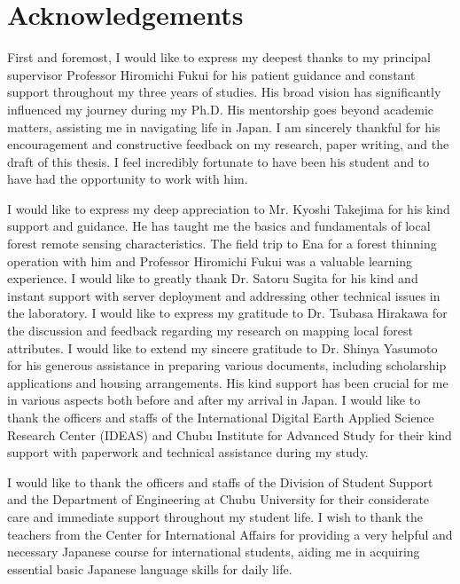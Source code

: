 \chapter*{Acknowledgements}
First and foremost, I would like to express my deepest thanks to my principal supervisor Professor Hiromichi Fukui for his patient guidance and constant support throughout my three years of studies. His broad vision has significantly influenced my journey during my Ph.D. His mentorship goes beyond academic matters, assisting me in navigating life in Japan. I am sincerely thankful for his encouragement and constructive feedback on my research, paper writing, and the draft of this thesis. I feel incredibly fortunate to have been his student and to have had the opportunity to work with him. \par

I would like to express my deep appreciation to Mr. Kyoshi Takejima for his kind support and guidance. He has taught me the basics and fundamentals of local forest remote sensing characteristics. The field trip to Ena for a forest thinning operation with him and Professor Hiromichi Fukui was a valuable learning experience. I would like to greatly thank Dr. Satoru Sugita for his kind and instant support with server deployment and addressing other technical issues in the laboratory. I would like to express my gratitude to Dr. Tsubasa Hirakawa for the discussion and feedback regarding my research on mapping local forest attributes. I would like to extend my sincere gratitude to Dr. Shinya Yasumoto for his generous assistance in preparing various documents, including scholarship applications and housing arrangements. His kind support has been crucial for me in various aspects both before and after my arrival in Japan. I would like to thank the officers and staffs of the International Digital Earth Applied Science Research Center (IDEAS) and Chubu Institute for Advanced Study for their kind support with paperwork and technical assistance during my study. \par

I would like to thank the officers and staffs of the Division of Student Support and the Department of Engineering at Chubu University for their considerate care and immediate support throughout my student life. I wish to thank the teachers from the Center for International Affairs for providing a very helpful and necessary Japanese course for international students, aiding me in acquiring essential basic Japanese language skills for daily life. \par

